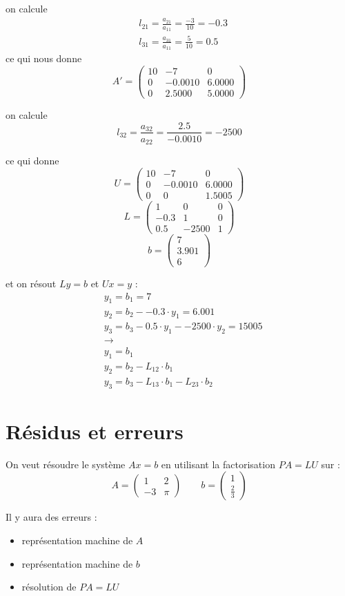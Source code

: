 \documentclass[a4paper,9pt]{extarticle}
\newcommand{\matd}[4]{\begin{pmatrix}#1 & #2 \\ #3 & #4\end{pmatrix}}
\newcommand{\matdd}[2]{\begin{pmatrix}#1 \\ #2\end{pmatrix}}
\begin{document}
on calcule
\begin{align*}
& l_{21} = \frac{a_{21}}{a_{11}} = \frac{-3}{10} = -0.3 \\
& l_{31} = \frac{a_{31}}{a_{11}} = \frac{5}{10} = 0.5
\end{align*}
ce qui nous donne
$$
A' =
\begin{pmatrix}
10 & -7 & 0 \\
0 &  -0.0010 &   6.0000 \\
0 &   2.5000 &   5.0000
\end{pmatrix}
$$

on calcule
$$
l_{32} = \frac{a_{32}}{a_{22}} = \frac{2.5}{-0.0010} = -2500
$$

ce qui donne
$$
U =
\begin{pmatrix}
10 & -7 & 0 \\
0 &  -0.0010 &   6.0000 \\
0 & 0 & 1.5005
\end{pmatrix}
$$
$$
L = 
\begin{pmatrix}
  1  &       0   &      0 \\
  -0.3  &  1  &       0 \\
  0.5  & -2500  &  1
\end{pmatrix}
$$
$$
b =
\begin{pmatrix}
7 \\ 3.901 \\ 6
\end{pmatrix}
$$

et on résout $Ly=b$ et $Ux=y$ :
\begin{align*}
& y_1 = b_1  = 7\\
& y_2 = b_2 - -0.3 \cdot y_1 = 6.001\\
& y_3 = b_3 - 0.5 \cdot y_1 - -2500 \cdot y_2 = 15005  \\
& \rightarrow \\
& y_1 = b_1 \\
& y_2 = b_2 - L_{12} \cdot b_1 \\
& y_3 = b_3 - L_{13} \cdot b_1 - L_{23} \cdot b_2
\end{align*}

\chapter{Résidus et erreurs}
On veut résoudre le système $Ax=b$ en utilisant la factorisation $PA = LU$ sur :
$$
A = \matd{1}{2}{-3}{\pi} \qquad b = \matdd{1}{\frac{2}{3}}
$$

Il y aura des erreurs :
\begin{itemize}
   \item représentation machine de $A$
   \item représentation machine de $b$
   \item résolution de $PA = LU$
\end{itemize}
\end{document}
